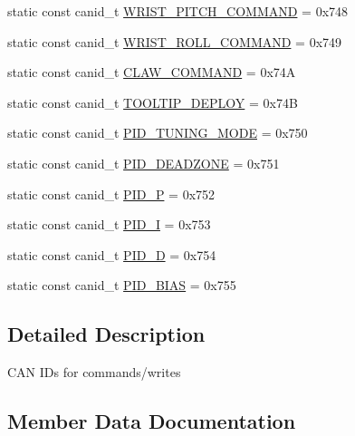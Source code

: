 \begin{DoxyCompactItemize}
static const canid\+\_\+t \hyperlink{structuwrt_1_1arm_1_1can__id_1_1_set_afa2c88815d5c513ee325da83a685f446}{W\+R\+I\+S\+T\+\_\+\+P\+I\+T\+C\+H\+\_\+\+C\+O\+M\+M\+A\+ND} = 0x748
\item 
static const canid\+\_\+t \hyperlink{structuwrt_1_1arm_1_1can__id_1_1_set_a16739ab7600b94c74d80983923f26434}{W\+R\+I\+S\+T\+\_\+\+R\+O\+L\+L\+\_\+\+C\+O\+M\+M\+A\+ND} = 0x749
\item 
static const canid\+\_\+t \hyperlink{structuwrt_1_1arm_1_1can__id_1_1_set_a04c95641da03af9913aaf4c7b2014d2b}{C\+L\+A\+W\+\_\+\+C\+O\+M\+M\+A\+ND} = 0x74A
\item 
static const canid\+\_\+t \hyperlink{structuwrt_1_1arm_1_1can__id_1_1_set_a30a32e87691781dc9d6cc34175a4bf06}{T\+O\+O\+L\+T\+I\+P\+\_\+\+D\+E\+P\+L\+OY} = 0x74B
\item 
static const canid\+\_\+t \hyperlink{structuwrt_1_1arm_1_1can__id_1_1_set_a77e9a4a1f79b8edbff6712a7d70083bb}{P\+I\+D\+\_\+\+T\+U\+N\+I\+N\+G\+\_\+\+M\+O\+DE} = 0x750
\item 
static const canid\+\_\+t \hyperlink{structuwrt_1_1arm_1_1can__id_1_1_set_ab5a1f00f9ce98c896671623f007ff45a}{P\+I\+D\+\_\+\+D\+E\+A\+D\+Z\+O\+NE} = 0x751
\item 
static const canid\+\_\+t \hyperlink{structuwrt_1_1arm_1_1can__id_1_1_set_ab666f9f830c47bb25c21017495a2b8fd}{P\+I\+D\+\_\+P} = 0x752
\item 
static const canid\+\_\+t \hyperlink{structuwrt_1_1arm_1_1can__id_1_1_set_a58a1c4a1ca8419e1811ff9df15184535}{P\+I\+D\+\_\+I} = 0x753
\item 
static const canid\+\_\+t \hyperlink{structuwrt_1_1arm_1_1can__id_1_1_set_a12d83aa98072fc84f1c5c04a6e8b98e8}{P\+I\+D\+\_\+D} = 0x754
\item 
static const canid\+\_\+t \hyperlink{structuwrt_1_1arm_1_1can__id_1_1_set_a57dc39813fe5a8bee6022c44a7c64e75}{P\+I\+D\+\_\+\+B\+I\+AS} = 0x755
\end{DoxyCompactItemize}


\subsection{Detailed Description}
C\+AN I\+Ds for commands/writes 

\subsection{Member Data Documentation}
\mbox{\label{structuwrt_1_1arm_1_1can__id_1_1_set_a04c95641da03af9913aaf4c7b2014d2b}} 
